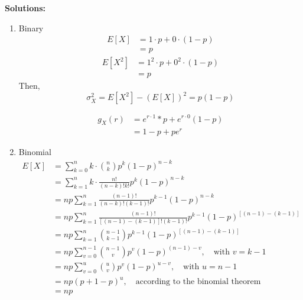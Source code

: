 \documentclass[UTF8]{article}
\begin{document}
    \textbf{Solutions:}
    \begin{enumerate}
        \item Binary
            \begin{equation*}
                \begin{split}
                    E[X] &= 1\cdot p+0\cdot(1-p)\\
                    &=p                    
                \end{split}            
            \end{equation*}
            \begin{equation*}
                \begin{split}
                    E[X^2] &= 1^2\cdot p+0^2\cdot(1-p)\\
                    &= p
                \end{split}
            \end{equation*}
        Then, 
            \begin{equation*}
                \sigma^2_X=E[X^2]-(E[X])^2=p(1-p)
            \end{equation*}
            
            \begin{equation*}
                \begin{split}
                    g_X(r) &= e^{r\cdot1}*p+e^{r\cdot0}(1-p)\\
                    &=1-p+pe^r
                \end{split}
            \end{equation*}
        \item Binomial
            \begin{equation*}
                \begin{split}
                    E[X] &=\sum^n_{k=0}k\cdot\binom{n}{k}p^k(1-p)^{n-k}\\
                    &=\sum^n_{k=1}k\cdot\frac{n!}{(n-k)!k!}p^k(1-p)^{n-k}\\
                    &=np\sum^n_{k=1}\frac{(n-1)!}{(n-k)!(k-1)!}p^{k-1}(1-p)^{n-k}\\
                    &=np\sum^{n}_{k=1}\frac{(n-1)!}{[(n-1)-(k-1)]!(k-1)!}p^{k-1}(1-p)^{[(n-1)-(k-1)]}\\
                    &=np\sum^{n}_{k=1}\binom{n-1}{k-1}p^{k-1}(1-p)^{[(n-1)-(k-1)]}\\
                    &=np\sum^{n-1}_{v=0}\binom{n-1}{v}p^v(1-p)^{(n-1)-v},\quad\text{with $v=k-1$}\\
                    &=np\sum^{u}_{v=0}\binom{u}{v}p^v(1-p)^{u-v},\quad\text{with $u=n-1$}\\
                    &=np(p+1-p)^u,\quad\text{according to the binomial theorem }\\
                    &=np
                \end{split}
            \end{equation*}


\end{enumerate}
\end{document}
